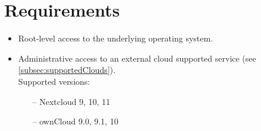 \section{Requirements}
\begin{itemize}
    \item Root-level access to the underlying operating system.
    \item Administrative access to an external cloud supported service (see \ref{subsec:supportedClouds}).\\
    Supported versions:
    \begin{itemize}
        \item[--] Nextcloud 9, 10, 11
        \item[--] ownCloud 9.0, 9.1, 10
    \end{itemize}
\end{itemize}